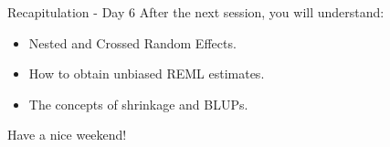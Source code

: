 \documentclass{beamer}
\begin{document}
\begin{frame}{Recapitulation - Day 6}
After the next session, you will understand:
\begin{itemize}
  \item Nested and Crossed Random Effects.
  \item How to obtain unbiased REML estimates.
  \item The concepts of shrinkage and BLUPs.
\end{itemize}
Have a nice weekend!
\end{frame}
\end{document}
